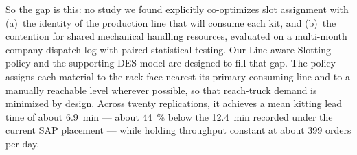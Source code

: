 So the gap is this: no study we found explicitly co-optimizes slot
assignment with (a)~the identity of the production line that will consume
each kit, and (b)~the contention for shared mechanical handling resources,
evaluated on a multi-month company dispatch log with paired statistical
testing.
Our Line-aware Slotting policy and the supporting DES model are designed
to fill that gap.
The policy assigns each material to the rack face nearest its primary
consuming line and to a manually reachable level wherever possible, so that
reach-truck demand is minimized by design.
Across twenty replications, it achieves a mean kitting lead time of about
\SI{6.9}{\minute} — about \SI{44}{\percent} below the \SI{12.4}{\minute}
recorded under the current SAP placement — while holding throughput
constant at about 399 orders per day.
